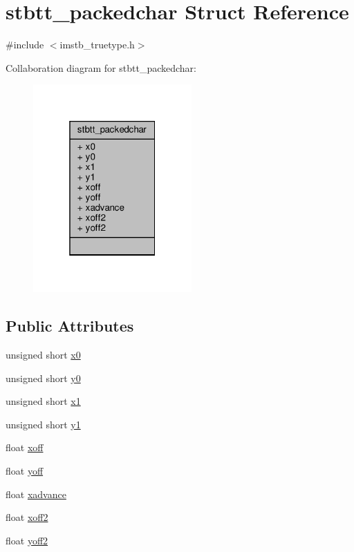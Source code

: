 \hypertarget{structstbtt__packedchar}{}\section{stbtt\+\_\+packedchar Struct Reference}
\label{structstbtt__packedchar}


{\ttfamily \#include $<$imstb\+\_\+truetype.\+h$>$}



Collaboration diagram for stbtt\+\_\+packedchar\+:
\nopagebreak
\begin{figure}[H]
\begin{center}
\leavevmode
\includegraphics[width=172pt]{structstbtt__packedchar__coll__graph}
\end{center}
\end{figure}
\subsection*{Public Attributes}
\begin{DoxyCompactItemize}
\item 
unsigned short \hyperlink{structstbtt__packedchar_a02cb73a5af37ed60dafd5e4b731af09e}{x0}
\item 
unsigned short \hyperlink{structstbtt__packedchar_a43429c9545ca8ccf14012cedcf83c1a7}{y0}
\item 
unsigned short \hyperlink{structstbtt__packedchar_a99d371f0261cd13dfd1a179f143175d1}{x1}
\item 
unsigned short \hyperlink{structstbtt__packedchar_a9569073ba79fad355210b6ffc35905a7}{y1}
\item 
float \hyperlink{structstbtt__packedchar_adb30c50674c79d32116ae6f94bd5893f}{xoff}
\item 
float \hyperlink{structstbtt__packedchar_a6f342ae10df5319f4999ffd256567142}{yoff}
\item 
float \hyperlink{structstbtt__packedchar_a28707ae98d1fa946b3390840aeff76ab}{xadvance}
\item 
float \hyperlink{structstbtt__packedchar_a3a33880f925ca826c908cbf9f0673c9f}{xoff2}
\item 
float \hyperlink{structstbtt__packedchar_a2ec5bbd1010c9a9b7cbdeb7503dcaffa}{yoff2}
\end{DoxyCompactItemize}


